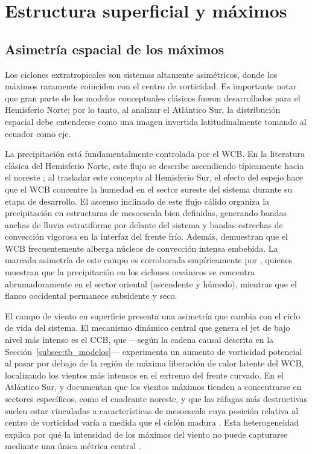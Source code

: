 
\section{Estructura superficial y máximos}\label{sec:tb_compuestos}

\subsection{Asimetría espacial de los máximos}\label{subsec:tb_kde_asimetria}

Los ciclones extratropicales son sistemas altamente asimétricos, donde los máximos raramente coinciden con el centro de vorticidad. Es importante notar que gran parte de los modelos conceptuales clásicos fueron desarrollados para el Hemisferio Norte; por lo tanto, al analizar el Atlántico Sur, la distribución espacial debe entenderse como una imagen invertida latitudinalmente tomando al ecuador como eje.

La precipitación está fundamentalmente controlada por el WCB. En la literatura clásica del Hemisferio Norte, este flujo se describe ascendiendo típicamente hacia el noreste \citep{blanchard2021warm}; al trasladar este concepto al Hemisferio Sur, el efecto del espejo hace que el WCB concentre la humedad en el sector sureste del sistema durante su etapa de desarrollo. El ascenso inclinado de este flujo cálido organiza la precipitación en estructuras de mesoescala bien definidas, generando bandas anchas de lluvia estratiforme por delante del sistema y bandas estrechas de convección vigorosa en la interfaz del frente frío. Además, \citet{oertel2021warm} demuestran que el WCB frecuentemente alberga núcleos de convección intensa embebida. La marcada asimetría de este campo es corroborada empíricamente por \citet{naud2020evaluation}, quienes muestran que la precipitación en los ciclones oceánicos se concentra abrumadoramente en el sector oriental (ascendente y húmedo), mientras que el flanco occidental permanece subsidente y seco.

El campo de viento en superficie presenta una asimetría que cambia con el ciclo de vida del sistema. El mecanismo dinámico central que genera el jet de bajo nivel más intenso es el CCB, que —según la cadena causal descrita en la Sección~\ref{subsec:tb_modelos}— experimenta un aumento de vorticidad potencial al pasar por debajo de la región de máxima liberación de calor latente del WCB, localizando los vientos más intensos en el extremo del frente curvado. En el Atlántico Sur, \citet{bitencourt2010relating} y \citet{cardoso2022synoptic} documentan que los vientos máximos tienden a concentrarse en sectores específicos, como el cuadrante noreste, y que las ráfagas más destructivas suelen estar vinculadas a características de mesoescala cuya posición relativa al centro de vorticidad varía a medida que el ciclón madura \citep{eisenstein2023identification}. Esta heterogeneidad explica por qué la intensidad de los máximos del viento no puede capturarse mediante una única métrica central \citep{corner2025classification}.

